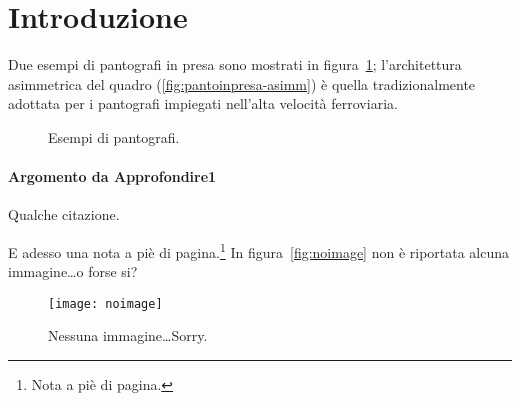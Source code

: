 %
%
\cleardoublepage
%
%
%
\chapter*{Introduzione}
%
%
\label{cap:introduzione}
%
%
Due esempi di pantografi in presa sono mostrati in figura~\ref{fig:pantoinpresa}; l'architettura asimmetrica del quadro (\ref{fig:pantoinpresa-asimm}) è quella tradizionalmente adottata per i pantografi impiegati nell'alta velocità ferroviaria.
%
%
\begin{figure}
%
\centering
%
\quad
%
%
\caption{Esempi di pantografi.}
%
\label{fig:pantoinpresa}
%
\end{figure}
%
%
\subsubsection{Argomento da Approfondire1}
%
Qualche citazione.
%
\lipsum[1-3]
%

\bigskip

E adesso una nota a piè di pagina.\footnote{Nota a piè di pagina.}
In figura~\vref{fig:noimage} non è riportata alcuna immagine\dots o forse si?
%
%
\begin{figure}
%
\centering
%
\texttt{[image: noimage]}
%
\caption{Nessuna immagine\dots Sorry.}
%
\label{fig:noimage}
%
\end{figure}
%
%
